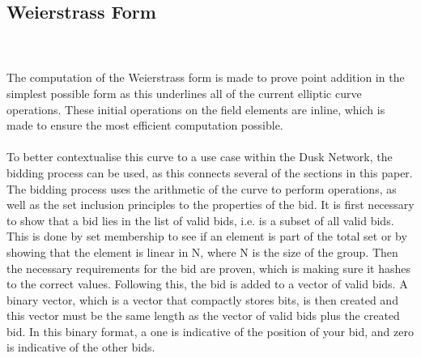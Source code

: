\documentclass{article}
\begin{document}
\subsection{Weierstrass Form}
\noindent{}\\\\
The computation of the Weierstrass form is made to prove point addition in the simplest possible form as this underlines all of the current elliptic curve operations. These initial operations on the field elements are inline, which is made to ensure the most efficient computation possible.\\\\

To better contextualise this curve to a use case within the Dusk Network, the bidding process can be used, as this connects several of the sections in this paper. The bidding process uses the arithmetic of the curve to perform operations, as well as the set inclusion principles to the properties of the bid. It is first necessary to show that a bid lies in the list of valid bids, i.e. is a subset of all valid bids. This is done by set membership to see if an element is part of the total set or by showing that the element is linear in N, where N is the size of the group. Then the necessary requirements for the bid are proven, which is making sure it hashes to the correct values. Following this, the bid is added to a vector of valid bids. A binary vector, which is a vector that compactly stores bits, is then created and this vector must be the same length as the vector of valid bids plus the created bid. In this binary format, a one is indicative of the position of your bid, and zero is indicative of the other bids.
\end{document}
